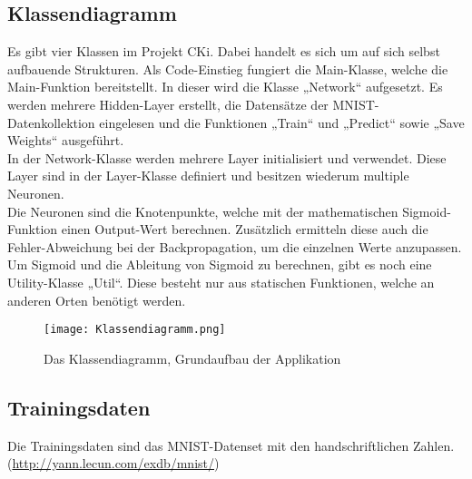 \subsection{Klassendiagramm}
\label{sec:DesignKlassendiagramm}
Es gibt vier Klassen im Projekt CKi. Dabei handelt es sich um auf sich selbst aufbauende Strukturen. Als Code-Einstieg fungiert die Main-Klasse, welche die Main-Funktion bereitstellt. In dieser wird die Klasse „Network“ aufgesetzt. Es werden mehrere Hidden-Layer erstellt, die Datensätze der MNIST-Datenkollektion eingelesen und die Funktionen „Train“ und „Predict“ sowie „Save Weights“ ausgeführt. 
\\
In der Network-Klasse werden mehrere Layer initialisiert und verwendet. Diese Layer sind in der Layer-Klasse definiert und besitzen wiederum multiple Neuronen.
\\
Die Neuronen sind die Knotenpunkte, welche mit der mathematischen Sigmoid-Funktion einen Output-Wert berechnen. Zusätzlich ermitteln diese auch die Fehler-Abweichung bei der Backpropagation, um die einzelnen Werte anzupassen.
\\
Um Sigmoid und die Ableitung von Sigmoid zu berechnen, gibt es noch eine Utility-Klasse „Util“. Diese besteht nur aus statischen Funktionen, welche an anderen Orten benötigt werden.


\begin{figure}[H]
	\centering
	\texttt{[image: Klassendiagramm.png]}
	\caption{Das Klassendiagramm, Grundaufbau der Applikation}
	\label{fig:designklassendiagramm}
\end{figure}

\subsection{Trainingsdaten}
\label{sec:DesignTrainingsdaten}
Die Trainingsdaten sind das MNIST-Datenset mit den handschriftlichen Zahlen. (\url{http://yann.lecun.com/exdb/mnist/})

